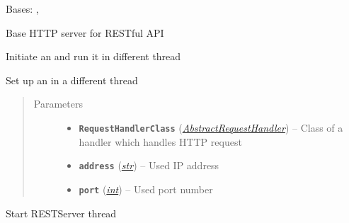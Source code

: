 \documentclass[letterpaper,10pt,english]{sphinxmanual}
\begin{document}
\begin{fulllineitems}
\label{util/api:escape.util.api.RESTServer}
Bases: \href{https://docs.python.org/2.7/library/basehttpserver.html\#BaseHTTPServer.HTTPServer}{}, 

Base HTTP server for RESTful API

Initiate an  and run it in different thread

\begin{fulllineitems}
\label{util/api:escape.util.api.RESTServer.__init__}
Set up an \href{https://docs.python.org/2.7/library/basehttpserver.html\#BaseHTTPServer.HTTPServer}{} in a different
thread
\begin{quote}\begin{description}
\item[{Parameters}] \leavevmode\begin{itemize}
\item {} 
\textbf{\texttt{RequestHandlerClass}} ({\hyperref[util/api:escape.util.api.AbstractRequestHandler]{\emph{\emph{AbstractRequestHandler}}}}) -- Class of a handler which handles HTTP request

\item {} 
\textbf{\texttt{address}} (\href{https://docs.python.org/2.7/library/functions.html\#str}{\emph{str}}) -- Used IP address

\item {} 
\textbf{\texttt{port}} (\href{https://docs.python.org/2.7/library/functions.html\#int}{\emph{int}}) -- Used port number

\end{itemize}

\end{description}\end{quote}

\end{fulllineitems}


\begin{fulllineitems}
\label{util/api:escape.util.api.RESTServer.start}
Start RESTServer thread


\end{fulllineitems}
\end{fulllineitems}
\end{document}
